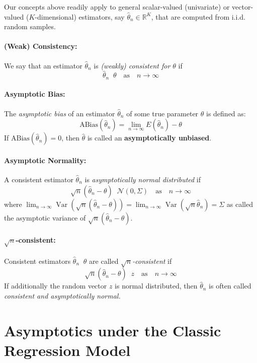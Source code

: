 \documentclass[
  14pt,
]{memoir}
\DeclareMathOperator{\V}{\operatorname{Var}}
\DeclareMathOperator{\toprob}{\overset{p}{\longrightarrow}}
\DeclareMathOperator{\todistr}{\overset{d}{\longrightarrow}}
\begin{document}
Our concepts above readily apply to general scalar-valued (univariate) or vector-valued (\(K\)-dimensional) estimators, say \(\hat\theta_n\in\mathbb{R}^K\), that are computed from i.i.d. random samples.

\paragraph*{(Weak) Consistency:}

We say that an estimator \(\hat\theta_n\) is \emph{(weakly) consistent for $\theta$} if
\[\hat\theta_n\toprob\theta\quad\text{as}\quad n\to\infty\]

\paragraph*{Asymptotic Bias:}

The \emph{asymptotic bias} of an estimator \(\hat\theta_n\) of some true parameter \(\theta\) is defined as:
\[\text{ABias}(\hat\theta_n)=\lim_{n\to\infty}E(\hat\theta_n)-\theta\]
If \(\text{ABias}(\hat\theta_n)=0\), then \(\hat\theta\) is called an \textbf{asymptotically unbiased}.

\paragraph*{Asymptotic Normality:}

A consistent estimator \(\hat\theta_n\) is \emph{asymptotically normal distributed} if
\[\sqrt{n}(\hat\theta_n-\theta)\todistr \mathcal{N}(0,\Sigma)\quad\text{as}\quad n\to\infty\]
where \(\lim_{n\to\infty}\V(\sqrt{n}(\hat\theta_n-\theta))=\lim_{n\to\infty}\V(\sqrt{n}\hat\theta_n)=\Sigma\) as called the asymptotic variance of \(\sqrt{n}(\hat\theta_n-\theta)\).

\paragraph*{$\sqrt{n}$-consistent:}

Consistent estimators \(\hat{\theta}_n\toprob\theta\) are called \emph{$\sqrt{n}$-consistent} if
\[\sqrt{n}(\hat\theta_n-\theta)\todistr z \quad\text{as}\quad n\to\infty\]
If additionally the random vector \(z\) is normal distributed, then \(\hat\theta_n\) is often called \emph{consistent and asymptotically normal.}

\hypertarget{asymptotics-under-the-classic-regression-model}{%
\section{Asymptotics under the Classic Regression Model}\label{asymptotics-under-the-classic-regression-model}}
\end{document}
